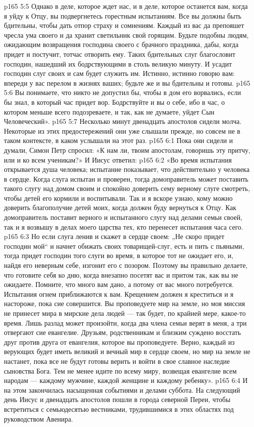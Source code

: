 \vs p165 5:5 Однако в деле, которое ждет нас, и в деле, которое останется вам, когда я уйду к Отцу, вы подвергнетесь горестным испытаниям. Все вы должны быть бдительны, чтобы дать отпор страху и сомнениям. Каждый из вас да препояшет чресла ума своего и да хранит светильник свой горящим. Будьте подобны людям, ожидающим возвращения господина своего с брачного праздника, дабы, когда придет и постучит, тотчас отворить ему. Таких бдительных слуг благословит господин, нашедший их бодрствующими в столь великую минуту. И усадит господин слуг своих и сам будет служить им. Истинно, истинно говорю вам: впереди у вас перелом в жизнях ваших; будьте же и вы бдительны и готовы.
\vs p165 5:6 Вы понимаете, что никто не допустил бы, чтобы в дом его ворвались, если бы знал, в который час придет вор. Бодрствуйте и вы о себе, ибо в час, о котором меньше всего подозреваете, и так, как не думаете, уйдет Сын Человеческий».
\vs p165 5:7 \pc Несколько минут двенадцать апостолов сидели молча. Некоторые из этих предостережений они уже слышали прежде, но совсем не в таком контексте, в каком услышали на этот раз.
\vs p165 6:1 Пока они сидели и думали, Симон Петр спросил: «К нам ли, твоим апостолам, говоришь эту притчу, или и ко всем ученикам?» И Иисус ответил:
\vs p165 6:2 \pc «Во время испытания открывается душа человека; испытание показывает, что действительно у человека в сердце. Когда слуга испытан и проверен, тогда домоправитель может поставить такого слугу над домом своим и спокойно доверить сему верному слуге смотреть, чтобы детей его кормили и воспитывали. Так и я вскоре узнаю, кому можно доверить благополучие детей моих, когда должен буду вернуться к Отцу. Как домоправитель поставит верного и испытанного слугу над делами семьи своей, так и я возвышу в делах моего царства тех, кто перенесет испытания часа сего.
\vs p165 6:3 Но если слуга ленив и скажет в сердце своем: „Не скоро придет господин мой“ и начнет обижать своих товарищей\hyp{}слуг, есть и пить с пьяными, тогда придет господин того слуги во время, в которое тот не ожидает его, и, найдя его неверным себе, изгонит его с позором. Поэтому вы правильно делаете, что готовите себя ко дню, когда внезапно посетят вас и притом так, как вы не ожидаете. Помните, что много вам дано, а потому от вас много потребуется. Испытания огнем приближаются к вам. Крещением должен я креститься и я настороже, пока сие совершится. Вы проповедуете мир на земле, но моя миссия не принесет мира в мирские дела людей --- так будет, по крайней мере, какое\hyp{}то время. Лишь разлад может произойти, когда два члена семьи верят в меня, а три отвергают сие евангелие. Друзьям, родственникам и близким суждено восстать друг против друга от евангелия, которое вы проповедуете. Верно, каждый из верующих будет иметь великий и вечный мир в сердце своем, но мир на земле не настанет, пока все не будут готовы верить и войти в свое славное наследие сыновства Бога. Тем не менее идите по всему миру, возвещая евангелие всем народам --- каждому мужчине, каждой женщине и каждому ребенку».
\vs p165 6:4 \pc И на этом закончилась насыщенная событиями и делами суббота. На следующий день Иисус и двенадцать апостолов пошли в города северной Переи, чтобы встретиться с семьюдесятью вестниками, трудившимися в этих областях под руководством Авенира.

